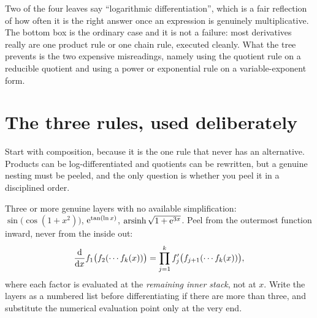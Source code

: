 Two of the four leaves say ``logarithmic differentiation'', which is a fair reflection of how often it is the right answer once an expression is genuinely multiplicative. The bottom box is the ordinary case and it is not a failure: most derivatives really are one product rule or one chain rule, executed cleanly. What the tree prevents is the two expensive misreadings, namely using the quotient rule on a reducible quotient and using a power or exponential rule on a variable-exponent form.

\section{The three rules, used deliberately}

Start with composition, because it is the one rule that never has an alternative. Products can be log-differentiated and quotients can be rewritten, but a genuine nesting must be peeled, and the only question is whether you peel it in a disciplined order.

\cue Three or more genuine layers with no available simplification: $\sin\bigl(\cos(1+x^{2})\bigr)$, $\mathrm{e}^{\tan(\ln x)}$, $\operatorname{arsinh}\sqrt{1+\mathrm{e}^{3x}}$.
\method Peel from the outermost function inward, never from the inside out:
\[
\frac{\mathrm{d}}{\mathrm{d}x}f_{1}\bigl(f_{2}(\cdots f_{k}(x))\bigr)=\prod_{j=1}^{k}f_{j}'\bigl(f_{j+1}(\cdots f_{k}(x))\bigr),
\]
where each factor is evaluated at the \emph{remaining inner stack}, not at $x$. Write the layers as a numbered list before differentiating if there are more than three, and substitute the numerical evaluation point only at the very end.

